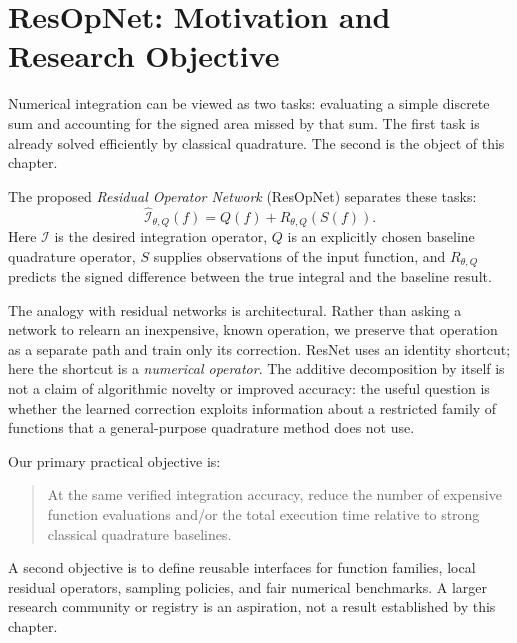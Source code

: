 
\section{ResOpNet: Motivation and Research Objective}
\label{sec:resop-motivation}

Numerical integration can be viewed as two tasks: evaluating a simple discrete
sum and accounting for the signed area missed by that sum. The first task is
already solved efficiently by classical quadrature. The second is the object of
this chapter.

The proposed \emph{Residual Operator Network} (ResOpNet) separates these tasks:
\begin{equation}
    \boxed{\widehat{\mathcal I}_{\theta,Q}(f)
        = Q(f)+R_{\theta,Q}(S(f)).}
    \label{eq:resop-principle}
\end{equation}
Here $\mathcal I$ is the desired integration operator, $Q$ is an explicitly
chosen baseline quadrature operator, $S$ supplies observations of the input
function, and $R_{\theta,Q}$ predicts the signed difference between the true
integral and the baseline result.

The analogy with residual networks is architectural. Rather than asking a
network to relearn an inexpensive, known operation, we preserve that operation
as a separate path and train only its correction. ResNet uses an identity
shortcut; here the shortcut is a \emph{numerical operator}. The additive
decomposition by itself is not a claim of algorithmic novelty or improved
accuracy: the useful question is whether the learned correction exploits
information about a restricted family of functions that a general-purpose
quadrature method does not use.

Our primary practical objective is:
\begin{quote}
    At the same verified integration accuracy, reduce the number of expensive
    function evaluations and/or the total execution time relative to strong
    classical quadrature baselines.
\end{quote}
A second objective is to define reusable interfaces for function families,
local residual operators, sampling policies, and fair numerical benchmarks.
A larger research community or registry is an aspiration, not a result
established by this chapter.

